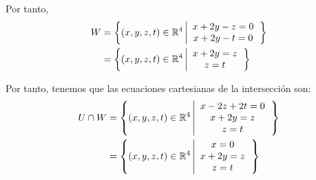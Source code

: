 \documentclass[12pt]{article}
\begin{document}
\begin{ejercicio}
\begin{enumerate}
        Por tanto,
        \begin{equation*}\begin{split}
            W&= \left\{(x,y,z,t)\in \mathbb{R}^4\left|\begin{array}{c}
                x+2y-z=0 \\
                x+2y-t=0 \\
            \end{array}\right.\right\} \\
            &= \left\{(x,y,z,t)\in \mathbb{R}^4\left|\begin{array}{c}
                x+2y=z \\
                z=t \\
            \end{array}\right.\right\} \\
        \end{split}\end{equation*}

        Por tanto, tenemos que las ecuaciones cartesianas de la intersección son:
        \begin{equation*}\begin{split}
            U\cap W&= \left\{(x,y,z,t)\in \mathbb{R}^4\left|\begin{array}{c}
                x-2z+2t=0 \\
                x+2y=z \\
                z=t \\
            \end{array}\right.\right\} \\
            &= \left\{(x,y,z,t)\in \mathbb{R}^4\left|\begin{array}{c}
                x=0 \\
                x+2y=z \\
                z=t \\
            \end{array}\right.\right\}
        \end{split}\end{equation*}
    \end{enumerate}
\end{ejercicio}
\end{document}
